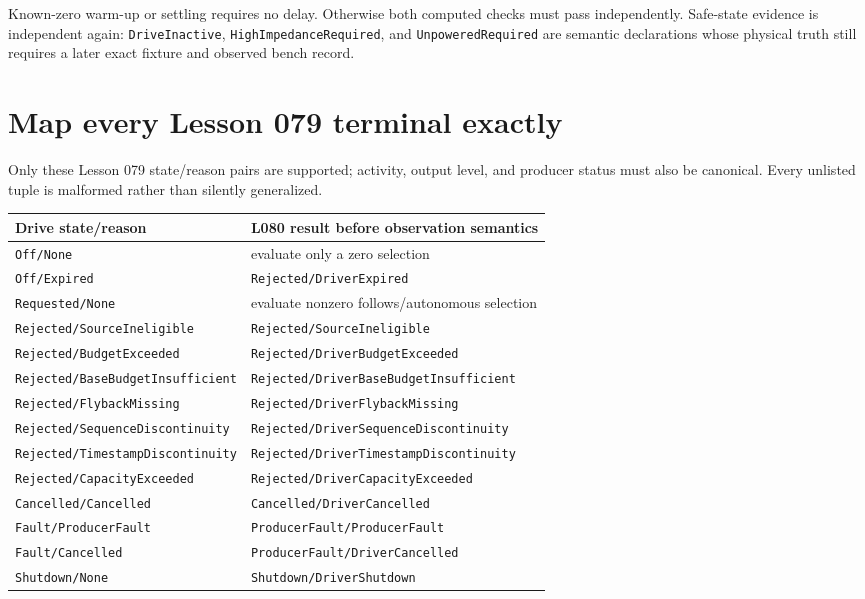 \documentclass[10pt]{article}
\begin{document}
Known-zero warm-up or settling requires no delay. Otherwise both computed
checks must pass independently. Safe-state evidence is independent again:
\texttt{DriveInactive}, \texttt{HighImpedanceRequired}, and
\texttt{UnpoweredRequired} are semantic declarations whose physical truth
still requires a later exact fixture and observed bench record.

\newpage
\section{Map every Lesson 079 terminal exactly}
Only these Lesson 079 state/reason pairs are supported; activity, output
level, and producer status must also be canonical. Every unlisted tuple is
malformed rather than silently generalized.

\begin{tabularx}{\linewidth}{@{}l X@{}}
\toprule
Drive state/reason & L080 result before observation semantics\\
\midrule
\texttt{Off/None} & evaluate only a zero selection\\
\texttt{Off/Expired} & \texttt{Rejected/DriverExpired}\\
\texttt{Requested/None} & evaluate nonzero follows/autonomous selection\\
\texttt{Rejected/SourceIneligible} & \texttt{Rejected/SourceIneligible}\\
\texttt{Rejected/BudgetExceeded} & \texttt{Rejected/DriverBudgetExceeded}\\
\texttt{Rejected/BaseBudgetInsufficient} & \texttt{Rejected/DriverBaseBudgetInsufficient}\\
\texttt{Rejected/FlybackMissing} & \texttt{Rejected/DriverFlybackMissing}\\
\texttt{Rejected/SequenceDiscontinuity} & \texttt{Rejected/DriverSequenceDiscontinuity}\\
\texttt{Rejected/TimestampDiscontinuity} & \texttt{Rejected/DriverTimestampDiscontinuity}\\
\texttt{Rejected/CapacityExceeded} & \texttt{Rejected/DriverCapacityExceeded}\\
\texttt{Cancelled/Cancelled} & \texttt{Cancelled/DriverCancelled}\\
\texttt{Fault/ProducerFault} & \texttt{ProducerFault/ProducerFault}\\
\texttt{Fault/Cancelled} & \texttt{ProducerFault/DriverCancelled}\\
\texttt{Shutdown/None} & \texttt{Shutdown/DriverShutdown}\\
\bottomrule
\end{tabularx}
\end{document}
